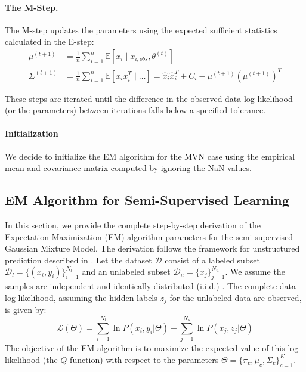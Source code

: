 \documentclass[11pt, a4paper]{article}
\begin{document}
\paragraph{The M-Step.}
The M-step updates the parameters using the expected sufficient statistics calculated in the E-step:
\begin{align}
\mu^{(t+1)} &= \frac{1}{n} \sum_{i=1}^n \mathbb{E}[x_i \mid x_{i,obs}, \theta^{(t)}] \\
\Sigma^{(t+1)} &= \frac{1}{n} \sum_{i=1}^n \mathbb{E}[x_i x_i^T \mid \dots] = \hat{x}_i \hat{x}_i^T + C_i - \mu^{(t+1)} (\mu^{(t+1)})^T
\end{align}

These steps are iterated until the difference in the observed-data log-likelihood (or the parameters) between iterations falls below a specified tolerance.

\paragraph{Initialization} We decide to initialize the EM algorithm for the MVN case using the empirical mean and covariance matrix computed by ignoring the NaN values.

\subsection{EM Algorithm for Semi-Supervised Learning}

In this section, we provide the complete step-by-step derivation of the Expectation-Maximization (EM) algorithm parameters for the semi-supervised Gaussian Mixture Model. The derivation follows the framework for unstructured prediction described in \citep{He2020}. Let the dataset $\mathcal{D}$ consist of a labeled subset $\mathcal{D}_l = \{(x_i, y_i)\}_{i=1}^{N_l}$ and an unlabeled subset $\mathcal{D}_u = \{x_j\}_{j=1}^{N_u}$. We assume the samples are independent and identically distributed (i.i.d.) \citep{He2020}. The complete-data log-likelihood, assuming the hidden labels $z_j$ for the unlabeled data are observed, is given by:
\begin{equation}
    \mathcal{L}(\Theta) = \sum_{i=1}^{N_l} \ln P(x_i, y_i|\Theta) + \sum_{j=1}^{N_u} \ln P(x_j, z_j|\Theta)
\end{equation}
The objective of the EM algorithm is to maximize the expected value of this log-likelihood (the $Q$-function) with respect to the parameters $\Theta = \{\pi_c, \mu_c, \Sigma_c\}_{c=1}^K$.
\end{document}
